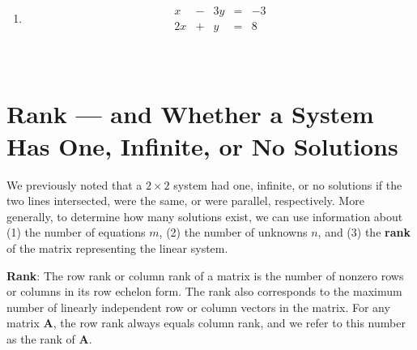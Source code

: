 \documentclass[]{book}
\theoremstyle{definition}
\theoremstyle{definition}
\theoremstyle{definition}
\theoremstyle{remark}
\begin{document}
\begin{enumerate}
        \item  $$\begin{matrix}
            x  & - & 3y & = & -3\\
            2x & + &  y & = &  8
            \end{matrix}$$\\
            \phantom{$\begin{matrix}
            x  & - & 3y & = & -3\\
               &   & 7y & = & 14\\          
            \end{matrix}$}
            \phantom{$\begin{matrix}
            x  & - & 3y & = & -3\\
               &   & y & = & 2\\            
            \end{matrix}$}\\
            \phantom{$\begin{matrix}
            x & = & 3\\
            y & = & 2\\         
            \end{matrix}$}
        \bigskip

            
\end{enumerate}

\section{Rank --- and Whether a System Has One, Infinite, or No
Solutions}\label{rank-and-whether-a-system-has-one-infinite-or-no-solutions}

We previously noted that a \(2\times 2\) system had one, infinite, or no
solutions if the two lines intersected, were the same, or were parallel,
respectively. More generally, to determine how many solutions exist, we
can use information about (1) the number of equations \(m\), (2) the
number of unknowns \(n\), and (3) the \textbf{rank} of the matrix
representing the linear system.

\textbf{Rank}: The row rank or column rank of a matrix is the number of
nonzero rows or columns in its row echelon form. The rank also
corresponds to the maximum number of linearly independent row or column
vectors in the matrix. For any matrix \textbf{A}, the row rank always
equals column rank, and we refer to this number as the rank of
\textbf{A}.
\end{document}
